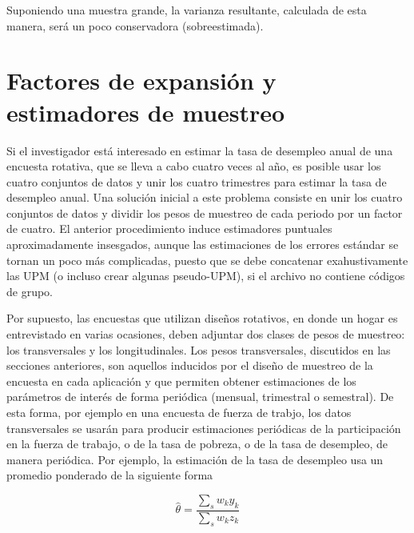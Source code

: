 \documentclass[
  12pt,
  spanish,
]{book}
\begin{document}
Suponiendo una muestra grande, la varianza resultante, calculada de esta manera, será un poco conservadora (sobreestimada).

\hypertarget{factores-de-expansiuxf3n-y-estimadores-de-muestreo}{%
\section{Factores de expansión y estimadores de muestreo}\label{factores-de-expansiuxf3n-y-estimadores-de-muestreo}}

Si el investigador está interesado en estimar la tasa de desempleo anual de una encuesta rotativa, que se lleva a cabo cuatro veces al año, es posible usar los cuatro conjuntos de datos y unir los cuatro trimestres para estimar la tasa de desempleo anual. Una solución inicial a este problema consiste en unir los cuatro conjuntos de datos y dividir los pesos de muestreo de cada periodo por un factor de cuatro. El anterior procedimiento induce estimadores puntuales aproximadamente insesgados, aunque las estimaciones de los errores estándar se tornan un poco más complicadas, puesto que se debe concatenar exahustivamente las UPM (o incluso crear algunas pseudo-UPM), si el archivo no contiene códigos de grupo.

Por supuesto, las encuestas que utilizan diseños rotativos, en donde un hogar es entrevistado en varias ocasiones, deben adjuntar dos clases de pesos de muestreo: los transversales y los longitudinales. Los pesos transversales, discutidos en las secciones anteriores, son aquellos inducidos por el diseño de muestreo de la encuesta en cada aplicación y que permiten obtener estimaciones de los parámetros de interés de forma periódica (mensual, trimestral o semestral). De esta forma, por ejemplo en una encuesta de fuerza de trabjo, los datos transversales se usarán para producir estimaciones periódicas de la participación en la fuerza de trabajo, o de la tasa de pobreza, o de la tasa de desempleo, de manera periódica. Por ejemplo, la estimación de la tasa de desempleo usa un promedio ponderado de la siguiente forma

\[\hat\theta=\frac{\sum_s w_ky_k}{\sum_s w_kz_k}\]
\end{document}
